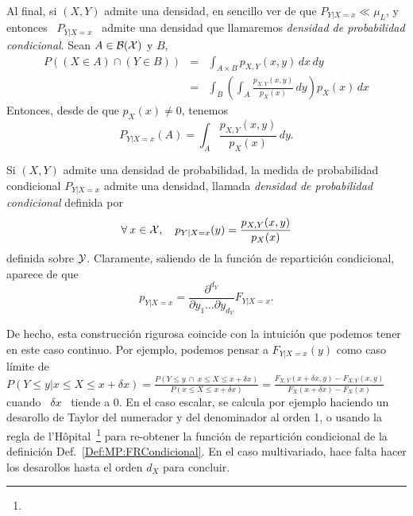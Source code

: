 Al final, si $(X,Y)$ admite una  densidad, en sencillo ver de que $P_{Y|X=x} \ll
\mu_L$,  y entonces  \ $P_{Y|X=x}$  \ admite  una densidad  que  llamaremos {\it
  densidad de probabilidad condicional}. Sean $A \in \mathcal{B}(\mathcal{X})$ y $B$,
%
\begin{eqnarray*}
P\left( (X \in A) \cap (Y \in B) \right) & = & \int_{A \times B} p_{X,Y}(x,y) \, dx \, dy\\[2mm]
%
& = & \int_B \left( \int_A \frac{p_{X,Y}(x,y)}{p_X(x)} \, dy \right) p_X(x) \, dx
\end{eqnarray*}
%
Entonces, desde de que $p_X(x) \ne 0$, tenemos
%
\[
P_{Y|X=x}(A) = \int_A \frac{p_{X,Y}(x,y)}{p_X(x)} \, dy.
\]
%
\begin{teorema}
  Si  $(X,Y)$ admite  una densidad  de probabilidad,  la medida  de probabilidad
  condicional  $P_{Y|X=x}$  admite  una   densidad,  llamada  {\it  densidad  de
    probabilidad condicional} definida por
  \[
  \forall \: x \in \mathcal{X}, \quad p_{Y|X=x}(y) = \frac{p_{X,Y}(x,y)}{p_X(x)}
  \]
  definida  sobre $\mathcal{Y}$. Claramente,  saliendo de  la funci\'on  de repartici\'on
  condicional, aparece de que
  \[
  p_{Y|X=x} = \frac{\partial^{d_Y}}{\partial y_1 \ldots \partial y_{d_Y}} F_{Y|X=x}.
  \]
\end{teorema}

De hecho, esta  construcci\'on rigurosa coincide con la  intuici\'on que podemos
tener en este  caso continuo. Por ejemplo, podemos  pensar a $F_{Y|X=x}(y)$ como
caso l\'imite de  $P(\left. Y \le y \right|  x \le X \le x+\delta x)  = \frac{P( Y
  \le  y \:  \cap \:  x \le  X \le  x+\delta x)}{P(x  \le X  \le x+\delta  x)} =
\frac{F_{X,Y}(x+\delta  x ,  y) -  F_{X,Y}(x  , y)}{F_X(x+\delta  x) -  F_X(x)}$
cuando \ $\delta  x$ \ tiende a 0.   En el caso escalar, se  calcula por ejemplo
haciendo un  desarollo de Taylor del numerador  y del denominador al  orden 1, o
usando la  regla de l'H\^opital~\footnote{}  para re-obtener la funci\'on
de        repartici\'on       condicional        de        la       definici\'on
Def.~\ref{Def:MP:FRCondicional}. En  el caso multivariado, hace  falta hacer los
desarollos hasta el orden $d_X$ para concluir.

